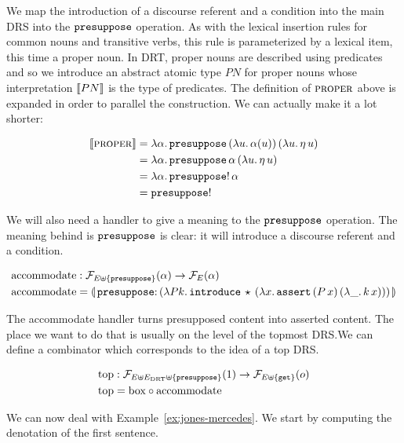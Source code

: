 \vspace{6mm}

We map the introduction of a discourse referent and a condition into the
main DRS into the $\mathtt{presuppose}$ operation. As with the lexical
insertion rules for common nouns and transitive verbs, this rule is
parameterized by a lexical item, this time a proper noun. In DRT, proper
nouns are described using predicates and so we introduce an abstract atomic
type $PN$ for proper nouns whose interpretation $\llbracket PN \rrbracket$ is the type of
predicates. The definition of $\textsc{proper}$ above is expanded in order to
parallel the construction. We can actually make it a lot shorter:

\begin{align*}
  \llbracket \textsc{proper} \rrbracket
  &= \lambda \alpha.\, \mathtt{presuppose}\,(\lambda u.\, \alpha(u))\,(\lambda u.\, \eta\,u) \\
  &= \lambda \alpha.\, \mathtt{presuppose}\,\alpha\,(\lambda u.\, \eta\,u) \\
  &= \lambda \alpha.\, \mathtt{presuppose}!\,\alpha \\
  &= \mathtt{presuppose}!
\end{align*}

We will also need a handler to give a meaning to the $\mathtt{presuppose}$
operation. The meaning behind is $\mathtt{presuppose}$ is clear: it will
introduce a discourse referent and a condition.

\begin{align*}
  \accommodate &: \FF_{E \uplus \{\op{presuppose}\}}(\alpha) \to \FF_E(\alpha) \\
  \accommodate &= \banana{\onto{\op{presuppose}}{(\lam{P k}{\app{\op{introduce}}{\star}{(\lam{x}{\app{\op{assert}}{(\ap{P}{x})}{(\lam{\_}{\ap{k}{x}})}})}})}}
\end{align*}

The accommodate handler turns presupposed content into asserted
content. The place we want to do that is usually on the level of the
topmost DRS.\@ We can define a combinator which corresponds to the idea of
a top DRS.

\begin{align*}
  \mathrm{top} &: \mathcal{F}_{E \uplus E_{\mathrm{DRT}} \uplus \{\mathtt{presuppose}\}}(1) \to \mathcal{F}_{E \uplus \{\mathtt{get}\}}(o) \\
  \mathrm{top} &= \mathrm{box} \circ \operatorname{accommodate}
\end{align*}

We can now deal with Example~\ref{ex:jones-mercedes}. We start by computing
the denotation of the first sentence.

